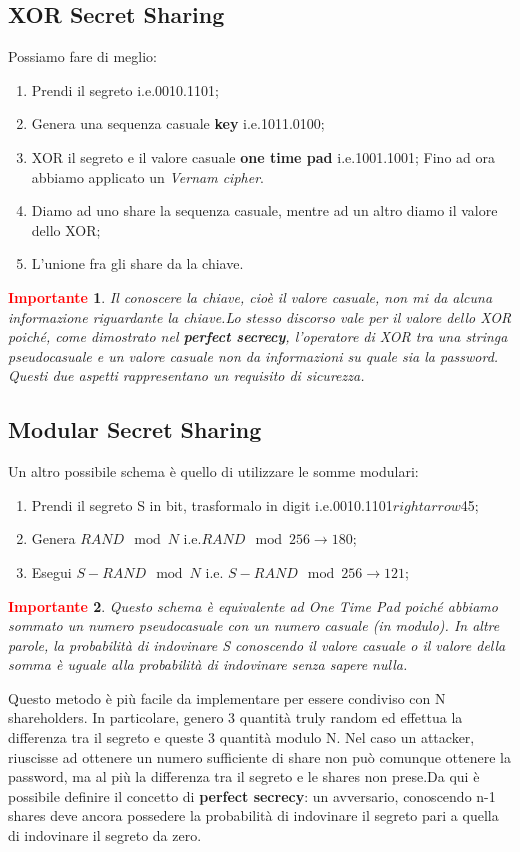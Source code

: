 \documentclass{book}
\newtheorem*{Importante}{\textbf{\textcolor{red}{Importante}}}
\begin{document}
\subsection{XOR Secret Sharing}
Possiamo fare di meglio:\begin{enumerate}
	\item Prendi il segreto i.e.0010.1101;
	\item Genera una sequenza casuale \textbf{key} i.e.1011.0100;
	\item XOR il segreto e il valore casuale \textbf{one time pad} i.e.1001.1001;\newline
	      Fino ad ora abbiamo applicato un \emph{Vernam cipher}\@.
	\item Diamo ad uno share la sequenza casuale, mentre ad un altro diamo il valore dello XOR;\@
	\item L'unione fra gli share da la chiave\@.
\end{enumerate}
\begin{Importante}
	Il conoscere la chiave, cioè il valore casuale, non mi da alcuna informazione riguardante la chiave\@.\newline Lo stesso discorso vale per il valore dello XOR poiché, come dimostrato nel \textbf{perfect secrecy}, l'operatore di XOR tra una stringa pseudocasuale e un valore casuale non da informazioni su quale sia la password\@.\newline
	Questi due aspetti rappresentano un requisito di sicurezza\@.
\end{Importante}
\newpage
\subsection{Modular Secret Sharing}
Un altro possibile schema è quello di utilizzare le somme modulari:\begin{enumerate}
	\item Prendi il segreto S in bit, trasformalo in digit i.e.0010.1101\(rightarrow\)45;
	\item Genera \(RAND\mod{N}\) i.e.\(RAND\mod{256} \rightarrow  180\);
	\item Esegui \(S-RAND\mod{N}\) i.e. \(S-RAND\mod{256}\rightarrow  121\);
\end{enumerate}
\begin{Importante}
	Questo schema è equivalente ad One Time Pad poiché abbiamo sommato un numero pseudocasuale con un numero casuale (in modulo)\@. In altre parole, la probabilità di indovinare S conoscendo il valore casuale o il valore della somma è uguale alla probabilità di indovinare senza sapere nulla\@.
\end{Importante}
Questo metodo è più facile da implementare per essere condiviso con N shareholders\@. In particolare, genero 3 quantità truly random ed effettua la differenza tra il segreto e queste 3 quantità modulo N\@.
Nel caso un attacker, riuscisse ad ottenere un numero sufficiente di share non può comunque ottenere la password, ma al più la differenza tra il segreto e le shares non prese\@.\newline Da qui è possibile definire il concetto di \textbf{perfect secrecy}: un avversario, conoscendo n-1 shares deve ancora possedere la probabilità di indovinare il segreto pari a quella di indovinare il segreto da zero\@.
\end{document}
